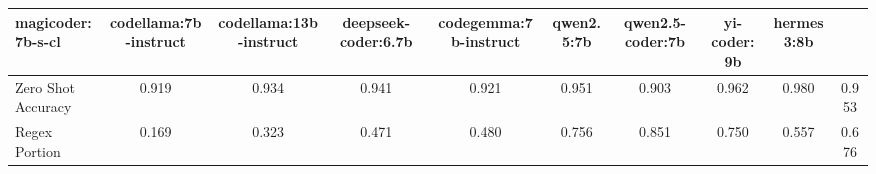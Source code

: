 \begin{tabular}{lccccccccc}
        \toprule
        magicoder:7b-s-cl & codellama:7b-instruct & codellama:13b-instruct & deepseek-coder:6.7b & codegemma:7b-instruct & qwen2.5:7b & qwen2.5-coder:7b & yi-coder:9b & hermes3:8b \\
        \midrule
        Zero Shot Accuracy & 0.919 & 0.934 & 0.941 & 0.921 & 0.951 & 0.903 & 0.962 & 0.980 & 0.953 \\
        Regex Portion & 0.169 & 0.323 & 0.471 & 0.480 & 0.756 & 0.851 & 0.750 & 0.557 & 0.676 \\
        \bottomrule
        \end{tabular}
    